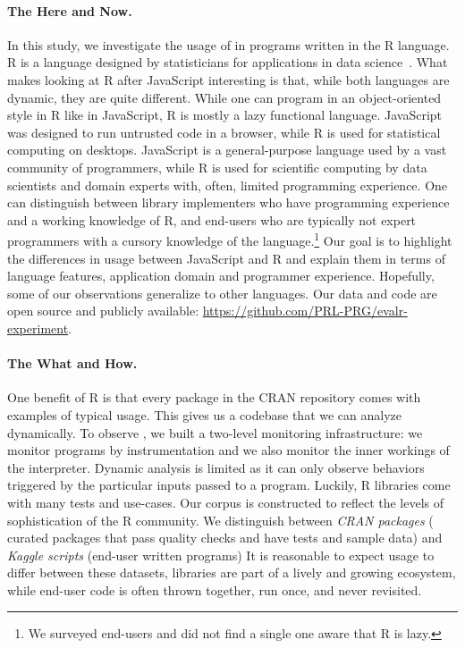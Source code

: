 \documentclass[screen,acmsmall]{acmart}%
\begin{document}
\paragraph{The Here and Now.} In this study, we investigate the
usage of \eval in programs written in the R language. R is a language designed
by statisticians for applications in data science~\cite{r,R96}. What makes
looking at R after JavaScript interesting is that, while both languages are
dynamic, they are quite different. While one can program in an object-oriented
style in R like in JavaScript, R is mostly a lazy functional language.
JavaScript was designed to run untrusted code in a browser, while R is used for
statistical computing on desktops. JavaScript is a general-purpose language used
by a vast community of programmers, while R is used for scientific computing by
data scientists and domain experts with, often, limited programming experience.
One can distinguish between library implementers who have programming experience
and a working knowledge of R, and end-users who are typically not expert
programmers with a cursory knowledge of the language.\footnote{We surveyed
end-users and did not find a single one aware that R is lazy.} Our goal is to
highlight the differences in usage between JavaScript and R and explain them in
terms of language features, application domain and programmer experience.
Hopefully, some of our observations generalize to other languages. Our data
and code are open source and publicly available:
\url{https://github.com/PRL-PRG/evalr-experiment}.

\paragraph{The What and How.} One benefit of
R is that every package in the CRAN repository comes with examples of typical
usage. This gives us a codebase that we can analyze dynamically. To observe
\eval, we built a two-level monitoring infrastructure: we monitor programs by
instrumentation and we also monitor the inner workings of the interpreter.
Dynamic analysis is limited as it can only observe behaviors triggered by the
particular inputs passed to a program. Luckily, R libraries come with many tests
and use-cases. Our corpus is constructed to reflect the levels of sophistication
of the R community. We distinguish between \emph{CRAN packages} (\CranPackages
curated packages that pass quality checks and have tests and sample data) and
\emph{Kaggle scripts} (\KaggleUnique end-user written programs) It is reasonable
to expect \eval usage to differ between these datasets, libraries are part of a
lively and growing ecosystem, while end-user code is often thrown together, run
once, and never revisited.
\end{document}
